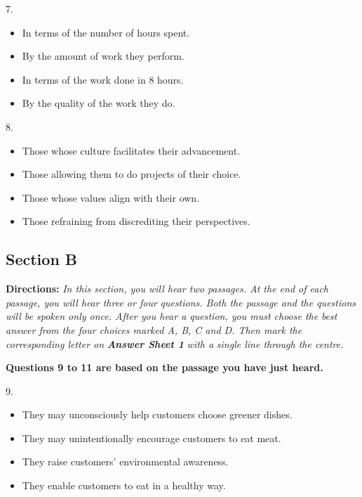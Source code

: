 \documentclass[UTF8,11pt]{ctexart}
\begin{document}
7.


\begin{itemize}[leftmargin=2em,itemsep=.2em,topsep=.4em]\item[A.] In terms of the number of hours spent.
\item[B.] By the amount of work they perform.
\item[C.] In terms of the work done in 8 hours.
\item[D.] By the quality of the work they do.
\end{itemize}

8.


\begin{itemize}[leftmargin=2em,itemsep=.2em,topsep=.4em]\item[A.] Those whose culture facilitates their advancement.
\item[B.] Those allowing them to do projects of their choice.
\item[C.] Those whose values align with their own.
\item[D.] Those refraining from discrediting their perspectives.
\end{itemize}

\subsection*{\textbf{Section B}}


\textbf{Directions:} \textit{In this section, you will hear two passages. At the end of each passage, you will hear three or four} \textit{questions. Both the passage and the questions will be spoken only once. After you hear a question, you must choose the} \textit{best answer from the four choices marked A, B, C and D. Then mark the corresponding letter on }\textbf{\textit{Answer Sheet 1}}\textit{ with a} \textit{single line through the centre.}


\textbf{Questions 9 to 11 are based on the passage you have just heard.}


9.


\begin{itemize}[leftmargin=2em,itemsep=.2em,topsep=.4em]\item[A.] They may unconsciously help customers choose greener dishes.
\item[B.] They may unintentionally encourage customers to eat meat.
\item[C.] They raise customers’ environmental awareness.
\item[D.] They enable customers to eat in a healthy way.
\end{itemize}
\end{document}
